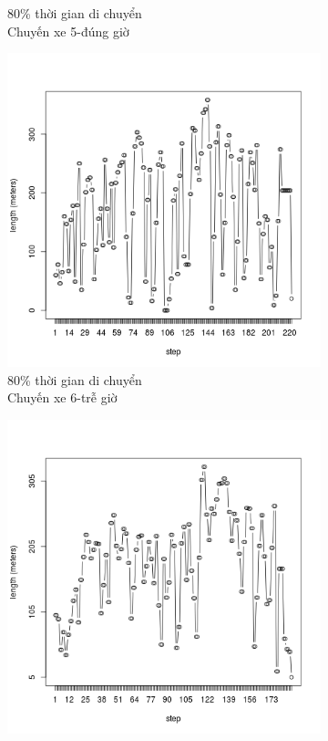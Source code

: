 \documentclass[a4paper, 13pt]{report}
\begin{document}
\begin{figure}
\begin{subfigure}[b]{0.25\textwidth}
                \caption*{80\% thời gian di chuyển\\Chuyến xe 5-đúng giờ}
        \end{subfigure}%
        \begin{subfigure}[b]{0.25\textwidth}
                \includegraphics[width=\linewidth]{test6}
                \caption*{80\% thời gian di chuyển\\Chuyến xe 6-trễ giờ}
        \end{subfigure}%
        \begin{subfigure}[b]{0.25\textwidth}
                \includegraphics[width=\linewidth]{test7}

\end{subfigure}
\end{figure}
\end{document}
